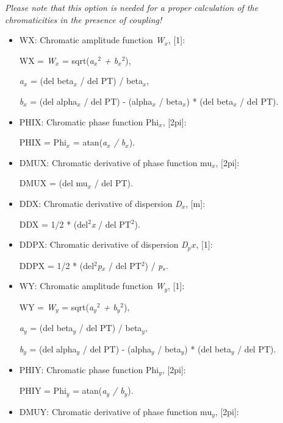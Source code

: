 \textit{Please note that this option is needed for a proper calculation of the chromaticities in the presence of coupling!}
\begin{itemize}
	\item WX: Chromatic amplitude function \textit{W$_x$}, [1]:     

WX = \textit{W$_x$} = sqrt(\textit{a$_x$$^2$ + b$_x$$^2$}),     

\textit{a$_x$} = (del beta$_\textit{x}$ / del PT) / beta$_\textit{x}$,     

\textit{b$_x$} = (del alpha$_\textit{x}$ / del PT) - (alpha$_\textit{x}$ / beta$_\textit{x}$) * (del beta$_\textit{x}$ / del PT).     


	\item PHIX: Chromatic phase function Phi$_\textit{x}$, [2pi]:     

PHIX = Phi$_\textit{x}$ = atan(\textit{a$_x$ / b$_x$}).     


	\item DMUX: Chromatic derivative of phase function mu$_\textit{x}$, [2pi]:     

DMUX = (del mu$_\textit{x}$ / del PT).     


	\item DDX: Chromatic derivative of dispersion \textit{D$_x$}, [m]:     

DDX = 1/2 * (del$^2$\textit{x} / del PT$^2$).     


	\item DDPX: Chromatic derivative of dispersion \textit{D$_px$}, [1]:     

DDPX = 1/2 * (del$^2$\textit{p$_x$} / del PT$^2$) / \textit{p$_s$}.     


	\item WY: Chromatic amplitude function \textit{W$_y$}, [1]:     

WY = \textit{W$_y$} = sqrt(\textit{a$_y$$^2$ + b$_y$$^2$}),     

\textit{a$_y$} = (del beta$_\textit{y}$ / del PT) / beta$_\textit{y}$,     

\textit{b$_y$} = (del alpha$_\textit{y}$ / del PT) - (alpha$_\textit{y}$ / beta$_\textit{y}$) * (del beta$_\textit{y}$ / del PT).     


	\item PHIY: Chromatic phase function Phi$_\textit{y}$, [2pi]:     

PHIY = Phi$_\textit{y}$ = atan(\textit{a$_y$ / b$_y$}).     


	\item DMUY: Chromatic derivative of phase function mu$_\textit{y}$, [2pi]:     


\end{itemize}
